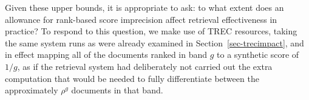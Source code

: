 


Given these upper bounds, it is appropriate to ask: to what extent
does an allowance for rank-based score imprecision affect retrieval
effectiveness in practice?
To respond to this question, we make use of TREC resources, taking
the same system runs as were already examined in
Section~\ref{sec-trecimpact}, and in effect mapping all of the
documents ranked in band $g$ to a synthetic score of $1/g$, as if the
retrieval system had deliberately not carried out the extra
computation that would be needed to fully differentiate between the
approximately $\rho^g$ documents in that band.

